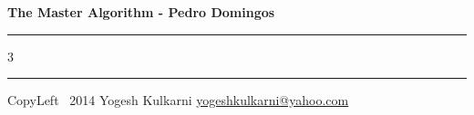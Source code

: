 \documentclass[8pt,landscape]{article}
\begin{document}
\begin{center}
     \Large{\textbf{The Master Algorithm - Pedro Domingos}}  %
\end{center}
\rule{\linewidth}{0.25pt}
\raggedright
\footnotesize
\begin{multicols}{3}




\rule{0.3\linewidth}{0.25pt}

\scriptsize
CopyLeft \textcopyleft\ 2014 Yogesh Kulkarni
\href{http://www.yogeshkulkarni.com}{yogeshkulkarni@yahoo.com}

\end{multicols}
\end{document}
